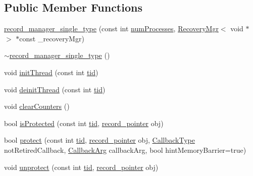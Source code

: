 \subsection*{Public Member Functions}
\begin{DoxyCompactItemize}
\item 
\hyperlink{classrecord__manager__single__type_af45310278dc150a918d53a6842af8074}{record\+\_\+manager\+\_\+single\+\_\+type} (const int \hyperlink{testing_8cpp_aa085812188e21ede75351d88b9b2c30d}{num\+Processes}, \hyperlink{classRecoveryMgr}{Recovery\+Mgr}$<$ void $\ast$$>$ $\ast$const \+\_\+recovery\+Mgr)
\item 
\hyperlink{classrecord__manager__single__type_adeb03ec2262c1b202204e4dcf09308f9}{$\sim$record\+\_\+manager\+\_\+single\+\_\+type} ()
\item 
void \hyperlink{classrecord__manager__single__type_aeb3ea05f3336b96766ea72131a814b57}{init\+Thread} (const int \hyperlink{microbench_2main_8cpp_a9ca9869868fe7e7a38a921cc7de4103f}{tid})
\item 
void \hyperlink{classrecord__manager__single__type_af8aa437cd719ffed1db4c6bee3b1909e}{deinit\+Thread} (const int \hyperlink{microbench_2main_8cpp_a9ca9869868fe7e7a38a921cc7de4103f}{tid})
\item 
void \hyperlink{classrecord__manager__single__type_a14bb98b1b90c16e99591d2a3f987f0c4}{clear\+Counters} ()
\item 
bool \hyperlink{classrecord__manager__single__type_a468c13eaacc74f5c4f5db14ccffe433f}{is\+Protected} (const int \hyperlink{microbench_2main_8cpp_a9ca9869868fe7e7a38a921cc7de4103f}{tid}, \hyperlink{classrecord__manager__single__type_a065f05d1a84e619758122b3da04b1327}{record\+\_\+pointer} obj)
\item 
bool \hyperlink{classrecord__manager__single__type_a01a1d6fd1820e8430b4304c58d55582d}{protect} (const int \hyperlink{microbench_2main_8cpp_a9ca9869868fe7e7a38a921cc7de4103f}{tid}, \hyperlink{classrecord__manager__single__type_a065f05d1a84e619758122b3da04b1327}{record\+\_\+pointer} obj, \hyperlink{globals_8h_a57f5c0d40b156d7d996492fb2f16e3cd}{Callback\+Type} not\+Retired\+Callback, \hyperlink{globals_8h_a3de64ef48066ac6430631c8b81a15345}{Callback\+Arg} callback\+Arg, bool hint\+Memory\+Barrier=true)
\item 
void \hyperlink{classrecord__manager__single__type_ae21f5c6f516be7b94c37eb81879b5099}{unprotect} (const int \hyperlink{microbench_2main_8cpp_a9ca9869868fe7e7a38a921cc7de4103f}{tid}, \hyperlink{classrecord__manager__single__type_a065f05d1a84e619758122b3da04b1327}{record\+\_\+pointer} obj)
$$
\end{DoxyCompactItemize}
